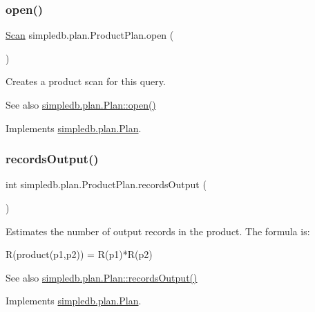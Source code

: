 \subsubsection{\texorpdfstring{open()}{open()}}
{\footnotesize\ttfamily \hyperlink{interfacesimpledb_1_1query_1_1Scan}{Scan} simpledb.\+plan.\+Product\+Plan.\+open (\begin{DoxyParamCaption}{ }\end{DoxyParamCaption})\hspace{0.3cm}{\ttfamily [inline]}}

Creates a product scan for this query. \begin{DoxySeeAlso}{See also}
\hyperlink{interfacesimpledb_1_1plan_1_1Plan_aaa4c15cda4e9c0d52308850f9f13ff99}{simpledb.\+plan.\+Plan\+::open()} 
\end{DoxySeeAlso}


Implements \hyperlink{interfacesimpledb_1_1plan_1_1Plan_aaa4c15cda4e9c0d52308850f9f13ff99}{simpledb.\+plan.\+Plan}.

\mbox{\label{classsimpledb_1_1plan_1_1ProductPlan_a5fce0180a7e282d587fc254dd302d009}} 
\subsubsection{\texorpdfstring{records\+Output()}{recordsOutput()}}
{\footnotesize\ttfamily int simpledb.\+plan.\+Product\+Plan.\+records\+Output (\begin{DoxyParamCaption}{ }\end{DoxyParamCaption})\hspace{0.3cm}{\ttfamily [inline]}}

Estimates the number of output records in the product. The formula is\+: 
\begin{DoxyPre} R(product(p1,p2)) = R(p1)*R(p2) \end{DoxyPre}
 \begin{DoxySeeAlso}{See also}
\hyperlink{interfacesimpledb_1_1plan_1_1Plan_a187e06657d356c80a7f743d7ff8fd257}{simpledb.\+plan.\+Plan\+::records\+Output()} 
\end{DoxySeeAlso}


Implements \hyperlink{interfacesimpledb_1_1plan_1_1Plan_a187e06657d356c80a7f743d7ff8fd257}{simpledb.\+plan.\+Plan}.

